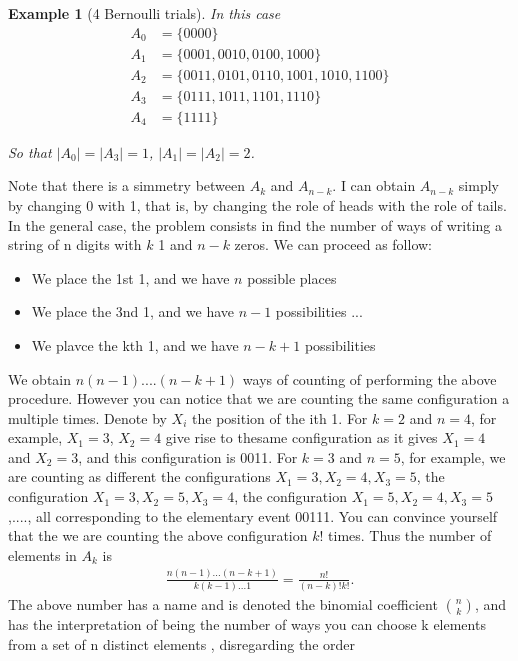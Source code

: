 \documentclass[12pt]{article}
\newtheorem{example}[theorem]{Example}
\newcommand{\<}{{\langle \!\! \langle}}
\renewcommand{\>}{{\rangle \!\! \rangle}}
\newcommand{\bel}[2]{\begin{equation} \label{#1} \begin{split} #2
 					\end{split} \end{equation}}
\begin{document}
\begin{example}[4 Bernoulli trials]

	In this case \bel{}{A_0 & = \{0000\}\\
				A_1 & =\{0001,0010,0100,1000\}\\
				A_2 & =\{0011,0101,0110,1001,1010,1100\}\\
				A_3 & = \{0111,1011,1101,1110\}\\
				A_4 & = \{1111\}
				}

			So that $|A_0|=|A_3| = 1 $, $|A_1 |= |A_2| =2$.
\end{example} 
Note that there is a simmetry between $A_k$ and $A_{n-k}$. I can obtain $A_{n-k}$ simply by changing 0 with 1, that is, by changing the role of heads with the role of tails. In the general case, the problem consists in find the number of ways of writing a string of n digits with $k$ 1 and $n-k$ zeros. We can proceed as follow: 
\begin{itemize}
	\item We place the 1st 1, and we have $n$ possible places 
	\item We place the 3nd 1, and we have $n-1$ possibilities 
		... 
	\item We plavce the kth 1, and we have $n-k+1$ possibilities
\end{itemize}


We obtain $n(n-1)....(n-k+1)$ ways of counting of performing the above procedure. However you can notice that we are counting the same configuration a multiple times. Denote by $X_i$ the position of the ith 1. For $k=2$ and $n=4$, for example, $X_1 = 3$, $X_2 = 4$ give rise to thesame configuration as it gives $X_1 = 4 $ and $X_2 =3$, and this configuration is 0011.  For $k= 3$ and $n=5$, for example, we are counting as different the configurations $X_1 = 3, X_2=4, X_3=5$,  the configuration $X_1 =3 ,X_2= 5 , X_3 =4$, the configuration $X_1 = 5, X_2 = 4, X_3 =5 $,...., all corresponding to the elementary event  00111. You can convince yourself that the we are counting the above configuration $k!$ times. Thus the number of elements in $A_k$ is 
\bel{}{\frac{n(n-1)...(n-k+1)}{k(k-1)...1}= \frac{n!}{(n-k)!k!}.}
The above number has a name and is denoted the binomial coefficient $n\choose{k}$, and has the interpretation of being the number of ways you can choose k elements from a set of n distinct elements , disregarding the order 
\end{document}
